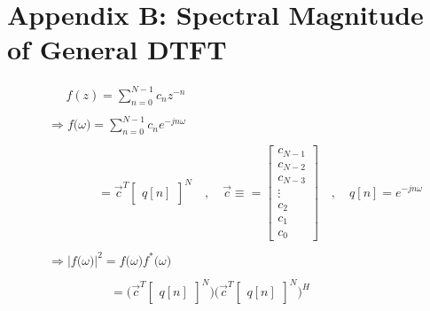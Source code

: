 \documentclass{article}
\begin{document}
\newpage
\section*{Appendix B: Spectral Magnitude of General DTFT}

\begin{align*}
    &\quad \ \ f(z) = \sum_{n = 0}^{N - 1}c_{n}z^{-n} \\ \\
    &\Rightarrow f\big(\omega\big) = \sum_{n = 0}^{N - 1}c_{n}e^{-jn\omega} \\ \\
    &\quad \quad \quad \quad = \vec{c}^{T}\begin{bmatrix} q[n] \end{bmatrix}^{N} \quad, \quad \vec{c} \equiv = \begin{bmatrix}
                                                                                                                    c_{N - 1} \\
                                                                                                                    c_{N - 2} \\
                                                                                                                    c_{N - 3} \\
                                                                                                                       \vdots \\
                                                                                                                    c_{    2} \\
                                                                                                                    c_{    1} \\
                                                                                                                    c_{    0}
                                                                                                                 \end{bmatrix} \quad, \quad q[n] = e^{-jn\omega} \\ \\
    &\Rightarrow \Big|f\big(\omega\big)\Big|^{2} = f\big(\omega\big)f^{*}\big(\omega\big) \\ \\
    &\quad \quad \quad \quad \quad = \bigg(\vec{c}^{T}\begin{bmatrix} q[n] \end{bmatrix}^{N}\bigg)\bigg(\vec{c}^{T}\begin{bmatrix} q[n] \end{bmatrix}^{N}\bigg)^{H} \\ \\

\end{align*}
\end{document}
